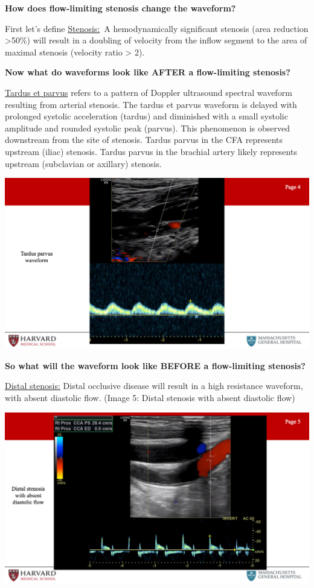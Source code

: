 \documentclass[
]{book}
\begin{document}
\textbf{How does flow-limiting stenosis change the waveform?}

First let's define \uline{Stenosis:}~A hemodynamically significant
stenosis (area reduction \textgreater50\%) will result in a doubling of velocity
from the inflow segment to the area of maximal stenosis (velocity ratio
\textgreater{} 2).

\textbf{Now what do waveforms look like AFTER a flow-limiting stenosis?}

\uline{Tardus et parvus} refers to a pattern of Doppler ultrasound
spectral waveform resulting from arterial stenosis. The tardus et parvus
waveform is delayed with prolonged systolic acceleration (tardus) and
diminished with a small systolic amplitude and rounded systolic peak
(parvus). This phenomenon is observed downstream from the site of
stenosis. Tardus parvus in the CFA represents upstream (iliac) stenosis.
Tardus parvus in the brachial artery likely represents upstream
(subclavian or axillary) stenosis.\citep{hwang2017, pellerito2019}

\includegraphics[width=15.01in]{images/vasc_lab2/Slide5}

\textbf{So what will the waveform look like BEFORE a flow-limiting stenosis?}

\uline{Distal stenosis:} Distal occlusive disease will result in a
high resistance waveform, with absent diastolic flow. (Image 5: Distal
stenosis with absent diastolic flow)

\includegraphics[width=15.01in]{images/vasc_lab2/Slide6}
\end{document}
